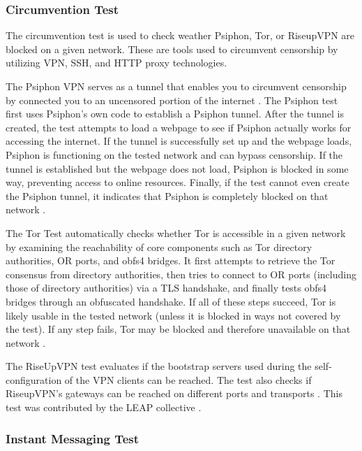 \subsubsection{Circumvention Test}

The circumvention test is used to check weather Psiphon, Tor, or RiseupVPN are blocked on a given network. These are tools used to circumvent censorship by utilizing VPN, SSH, and HTTP proxy technologies. 

The Psiphon VPN serves as a tunnel that enables you to circumvent censorship by connected you to an uncensored portion of the internet \cite{ooniPsiphonTest}. The Psiphon test first uses Psiphon’s own code to establish a Psiphon tunnel. After the tunnel is created, the test attempts to load a webpage to see if Psiphon actually works for accessing the internet. If the tunnel is successfully set up and the webpage loads, Psiphon is functioning on the tested network and can bypass censorship. If the tunnel is established but the webpage does not load, Psiphon is blocked in some way, preventing access to online resources. Finally, if the test cannot even create the Psiphon tunnel, it indicates that Psiphon is completely blocked on that network \cite{PsiphonTestGitHub}.

The Tor Test \cite{TorTestABOUTOONI} automatically checks whether Tor is accessible in a given network by examining the reachability of core components such as Tor directory authorities, OR ports, and obfs4 bridges. It first attempts to retrieve the Tor consensus from directory authorities, then tries to connect to OR ports (including those of directory authorities) via a TLS handshake, and finally tests obfs4 bridges through an obfuscated handshake. If all of these steps succeed, Tor is likely usable in the tested network (unless it is blocked in ways not covered by the test). If any step fails, Tor may be blocked and therefore unavailable on that network \cite{TorTestGitHub}.

The RiseUpVPN test evaluates if the bootstrap servers used during the self-configuration of the VPN clients can be reached. The test also checks if RiseupVPN’s gateways can be reached on different ports and transports \cite{RiseUpVPNTest}. This test was contributed by the LEAP collective \cite{leapLEAPEncryption}.

\subsubsection{Instant Messaging Test}

